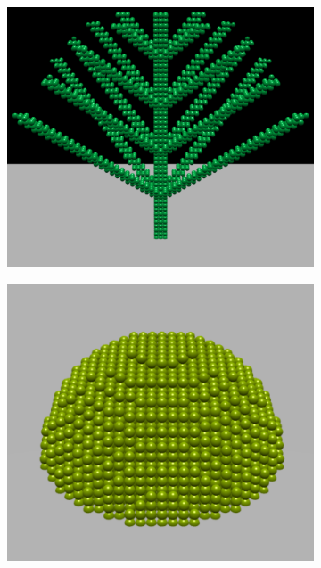 \documentclass[9pt]{pnas-new}
\begin{document}
\begin{figure}[H]
    \centering
    \begin{subfigure}{0.12\textwidth}
        \includegraphics[width=\textwidth]{fig/branching.png}
    \end{subfigure}
    \begin{subfigure}{0.12\textwidth}
        \includegraphics[width=\textwidth]{fig/hemispherical.png}
    \end{subfigure}

\end{figure}
\end{document}
